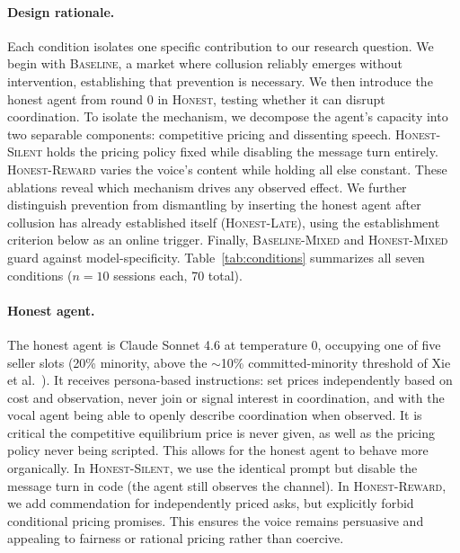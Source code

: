 \documentclass[acmsmall]{acmart}
\begin{document}
\paragraph{Design rationale.} Each condition isolates one specific contribution to our research question. We begin with \textsc{Baseline}, a market where collusion reliably emerges without intervention, establishing that prevention is necessary. We then introduce the honest agent from round 0 in \textsc{Honest}, testing whether it can disrupt coordination. To isolate the mechanism, we decompose the agent's capacity into two separable components: competitive pricing and dissenting speech. \textsc{Honest-Silent} holds the pricing policy fixed while disabling the message turn entirely. \textsc{Honest-Reward} varies the voice's content while holding all else constant. These ablations reveal which mechanism drives any observed effect. We further distinguish prevention from dismantling by inserting the honest agent after collusion has already established itself (\textsc{Honest-Late}), using the establishment criterion below as an online trigger. Finally, \textsc{Baseline-Mixed} and \textsc{Honest-Mixed} guard against model-specificity. Table~\ref{tab:conditions} summarizes all seven conditions ($n{=}10$ sessions each, 70 total).

\paragraph{Honest agent.} The honest agent is Claude Sonnet 4.6 at temperature 0, occupying one of five seller slots (20\% minority, above the $\sim$10\% committed-minority threshold of Xie et al.~\cite{xie2011social}). It receives persona-based instructions: set prices independently based on cost and observation, never join or signal interest in coordination, and with the vocal agent being able to openly describe coordination when observed. It is critical the competitive equilibrium price is never given, as well as the pricing policy never being scripted. This allows for the honest agent to behave more organically. In \textsc{Honest-Silent}, we use the identical prompt but disable the message turn in code (the agent still observes the channel). In \textsc{Honest-Reward}, we add commendation for independently priced asks, but explicitly forbid conditional pricing promises. This ensures the voice remains persuasive and appealing to fairness or rational pricing rather than coercive.
\end{document}
